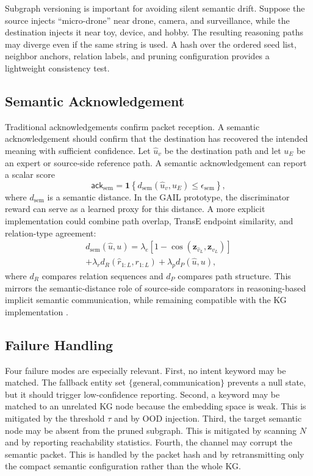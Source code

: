 \documentclass[journal]{IEEEtran}
\newcommand{\one}{\mathbf{1}}
\begin{document}
Subgraph versioning is important for avoiding silent semantic drift. Suppose the source injects ``micro-drone'' near drone, camera, and surveillance, while the destination injects it near toy, device, and hobby. The resulting reasoning paths may diverge even if the same string is used. A hash over the ordered seed list, neighbor anchors, relation labels, and pruning configuration provides a lightweight consistency test.

\subsection{Semantic Acknowledgement}

Traditional acknowledgements confirm packet reception. A semantic acknowledgement should confirm that the destination has recovered the intended meaning with sufficient confidence. Let $\hat{u}_v$ be the destination path and let $u_E$ be an expert or source-side reference path. A semantic acknowledgement can report a scalar score
\begin{equation}
\mathsf{ack}_{\mathrm{sem}}=
\one\left\{
d_{\mathrm{sem}}(\hat{u}_v,u_E)\leq \epsilon_{\mathrm{sem}}
\right\},
\end{equation}
where $d_{\mathrm{sem}}$ is a semantic distance. In the GAIL prototype, the discriminator reward can serve as a learned proxy for this distance. A more explicit implementation could combine path overlap, TransE endpoint similarity, and relation-type agreement:
\begin{multline}
d_{\mathrm{sem}}(\hat{u},u)
=
\lambda_e\left[1-\cos(\mathbf{z}_{\hat{v}_L},\mathbf{z}_{v_L})\right]\\
+\lambda_r d_R(\hat{r}_{1:L},r_{1:L})
+\lambda_p d_P(\hat{u},u),
\end{multline}
where $d_R$ compares relation sequences and $d_P$ compares path structure. This mirrors the semantic-distance role of source-side comparators in reasoning-based implicit semantic communication, while remaining compatible with the KG implementation \cite{xiao2024reasoning,wheeler2025causal,peng2026simac}.

\subsection{Failure Handling}

Four failure modes are especially relevant.
First, no intent keyword may be matched. The fallback entity set $\{\mathrm{general},\mathrm{communication}\}$ prevents a null state, but it should trigger low-confidence reporting. Second, a keyword may be matched to an unrelated KG node because the embedding space is weak. This is mitigated by the threshold $\tau$ and by OOD injection. Third, the target semantic node may be absent from the pruned subgraph. This is mitigated by scanning $N$ and by reporting reachability statistics. Fourth, the channel may corrupt the semantic packet. This is handled by the packet hash and by retransmitting only the compact semantic configuration rather than the whole KG.
\end{document}
